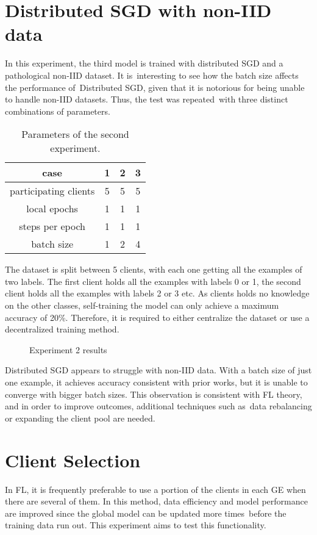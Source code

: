 \section{Distributed SGD with non-IID data}
In this experiment, the third model is trained with distributed SGD and a pathological non-IID dataset. It is interesting to see how the batch size affects the performance of Distributed SGD, given that it is notorious for being unable to handle non-IID datasets. Thus, the test was repeated with three distinct combinations of parameters.
\begin{table}[H]
    \center
    \begin{tabular}{ | c | c | c | c | }
        \hline
        case & 1 & 2 & 3\\
        \hline\hline
        participating clients & 5 & 5 & 5 \\
        \hline
        local epochs & 1 & 1 & 1 \\
        \hline
        steps per epoch & 1 & 1 & 1 \\
        \hline
        batch size & 1 & 2 & 4 \\
        \hline
    \end{tabular}
    \caption[Experiment 2 Parameters]{Parameters of the second experiment.}
    \label{table:Experiment 2 parameters}
\end{table}
The dataset is split between 5 clients, with each one getting all the examples of two labels. The first client holds all the examples with labels 0 or 1, the second client holds all the examples with labels 2 or 3 etc. As clients holds no knowledge on the other classes, self-training the model can only achieve a maximum accuracy of 20\%. Therefore, it is required to either centralize the dataset or use a decentralized training method.
\begin{figure}[H]
    \center
    
    \caption[Experiment 2 results]{Experiment 2 results}
    \label{fig:Experiment 2 results}
\end{figure}
Distributed SGD appears to struggle with non-IID data. With a batch size of just one example, it achieves accuracy consistent with prior works\cite{FL-original-paper}, but it is unable to converge with bigger batch sizes. This observation is consistent with FL theory, and in order to improve outcomes, additional techniques such as data rebalancing or expanding the client pool are needed.

\section{Client Selection}
In FL, it is frequently preferable to use a portion of the clients in each GE when there are several of them. In this method, data efficiency and model performance are improved since the global model can be updated more times before the training data run out. This experiment aims to test this functionality.

